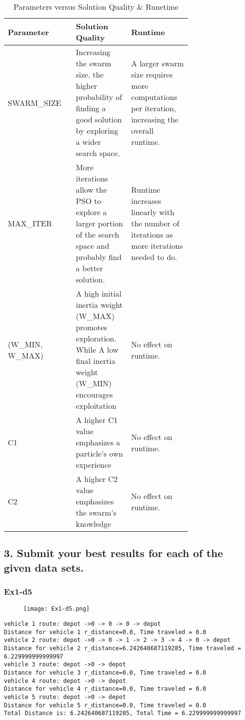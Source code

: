\documentclass[letterpaper, 12pt]{article}
\begin{document}
\begin{table}[htbp]
    \centering
\caption{Parameters versus Solution Quality \& Runetime }
    \begin{tabular}{|>{\centering\arraybackslash}p{0.25\linewidth}|>{\centering\arraybackslash}p{0.25\linewidth}|>{\centering\arraybackslash}p{0.25\linewidth}|} \hline 
         Parameter&  Solution Quality& Runtime\\ \hline 
         SWARM\_SIZE&  Increasing the swarm size, the higher probability of finding a good solution by exploring a wider search space.& A larger swarm size requires more computations per iteration, increasing the overall runtime.\\ \hline 
         MAX\_ITER&  More iterations allow the PSO to explore a larger portion of the search space and probably find a better solution.& Runtime increases linearly with the number of iterations as more iterations needed to do.\\ \hline 
         (W\_MIN, W\_MAX)&  A high initial inertia weight (W\_MAX) promotes exploration. While A low final inertia weight (W\_MIN) encourages exploitation& No effect on runtime.\\ \hline 
         C1&  A higher C1 value emphasizes a particle's own experience& No effect on runtime.\\ \hline 
         C2&  A higher C2 value emphasizes the swarm's knowledge& No effect on runtime.\\ \hline
    \end{tabular}
    
    
\end{table}


\subsection*{3. Submit your best results for each of the given data sets.}

\subsubsection{Ex1-d5}
\begin{figure}[htbp]
    \centering
    \texttt{[image: Ex1-d5.png]}
    
    
\end{figure}

\begin{lstlisting}
vehicle 1 route: depot ->0 -> 0 -> 0 -> depot
Distance for vehicle 1 r_distance=0.0, Time traveled = 0.0
vehicle 2 route: depot ->0 -> 0 -> 1 -> 2 -> 3 -> 4 -> 0 -> depot
Distance for vehicle 2 r_distance=6.242640687119285, Time traveled = 6.229999999999997
vehicle 3 route: depot ->0 -> depot
Distance for vehicle 3 r_distance=0.0, Time traveled = 0.0
vehicle 4 route: depot ->0 -> depot
Distance for vehicle 4 r_distance=0.0, Time traveled = 0.0
vehicle 5 route: depot ->0 -> depot
Distance for vehicle 5 r_distance=0.0, Time traveled = 0.0
Total Distance is: 6.242640687119285, Total Time = 6.229999999999997
\end{lstlisting}
\end{document}
